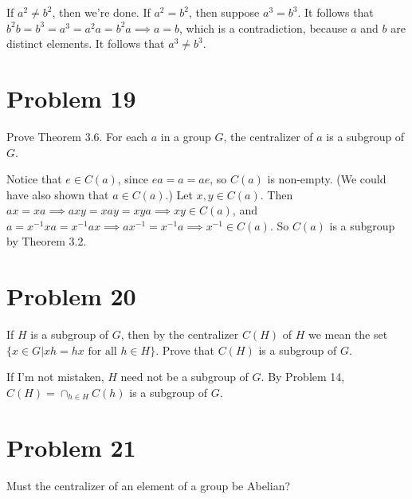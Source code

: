 \documentclass[12pt]{article}
\begin{document}
If $a^2\neq b^2$, then we're done.  If $a^2=b^2$, then suppose $a^3=b^3$.
It follows that $b^2b = b^3=a^3=a^2a=b^2a\implies a=b$, which is a contradiction,
because $a$ and $b$ are distinct elements.  It follows that $a^3\neq b^3$.

\section*{Problem 19}

Prove Theorem 3.6.  For each $a$ in a group $G$, the centralizer
of $a$ is a subgroup of $G$.

Notice that $e\in C(a)$, since $ea=a=ae$, so $C(a)$ is non-empty.  (We could
have also shown that $a\in C(a)$.)
Let $x,y\in C(a)$.  Then $ax=xa\implies axy=xay=xya\implies xy\in C(a)$,
and $a=x^{-1}xa=x^{-1}ax\implies ax^{-1}=x^{-1}a\implies x^{-1}\in C(a)$.
So $C(a)$ is a subgroup by Theorem 3.2.

\section*{Problem 20}

If $H$ is a subgroup of $G$, then by the centralizer $C(H)$ of $H$ we mean the
set $\{x\in G|\mbox{$xh=hx$ for all $h\in H$}\}$.  Prove that $C(H)$ is a subgroup of $G$.

If I'm not mistaken, $H$ need not be a subgroup of $G$.  By Problem 14,
$C(H)=\cap_{h\in H}C(h)$ is a subgroup of $G$.

\section*{Problem 21}

Must the centralizer of an element of a group be Abelian?

\end{document}
